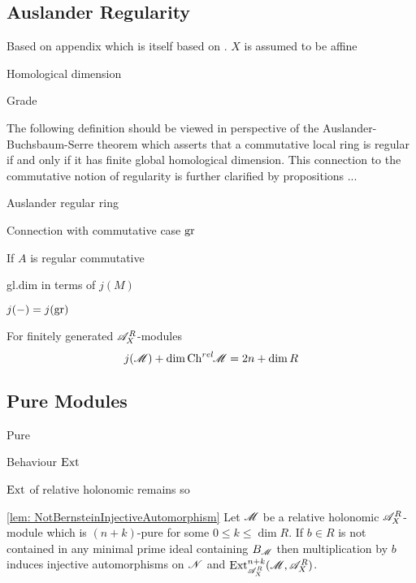 \subsection{Auslander Regularity}
Based on appendix \cite{budur2019zero} which is itself based on \cite{bjork1979rings}. $X$ is assumed to be affine
\begin{definition}
  Homological dimension
\end{definition}
\begin{definition}
  Grade
\end{definition}
The following definition should be viewed in perspective of  the Auslander-Buchsbaum-Serre theorem which asserts that a commutative local ring is regular if and only if it has finite global homological dimension. This connection to the commutative notion of regularity is further clarified by propositions ...
\begin{definition}
  Auslander regular ring
\end{definition}
\begin{proposition}
  Connection with commutative case $\operatorname{gr}$
\end{proposition}
\begin{proposition}
  If $A$ is regular commutative
\end{proposition}
\begin{proposition}
  gl.dim in terms of $j(M)$
\end{proposition}
\begin{proposition}
  $j({-}) = j(\operatorname{gr})$
\end{proposition}
\begin{corollary}\label{cor: AXRBehaviourGradesJAndChrel}
  For finitely generated $\mathscr{A}_X^R$-modules
  $$j(\mathscr{M}) + \dim \operatorname{Ch}^{rel}\mkern-5mu \mathscr{M} = 2n + \dim R $$
\end{corollary}
\subsection{Pure Modules}
\begin{definition}
  Pure
\end{definition}
\begin{lemma}
  Behaviour $\operatorname{Ext}$
\end{lemma}
\begin{lemma}
  $\operatorname{Ext}$ of relative holonomic remains so
\end{lemma}
\begin{lemma}\cref{lem: NotBernsteinInjectiveAutomorphism}
  Let $\mathscr{M}$ be a relative holonomic $\mathscr{A}_X^R$-module which is $(n+k)$-pure for some $0\leq k \leq \dim R$. If $b\in R$ is not contained in any minimal prime ideal containing $B_{\mathscr{M}}$ then multiplication by $b$ induces injective automorphisms on $\mathscr{N}$ and $\operatorname{Ext}^{n+k}_{\mathscr{A}_X^R}(\mathscr{M},\mathscr{A}_X^R)$.
\end{lemma}
